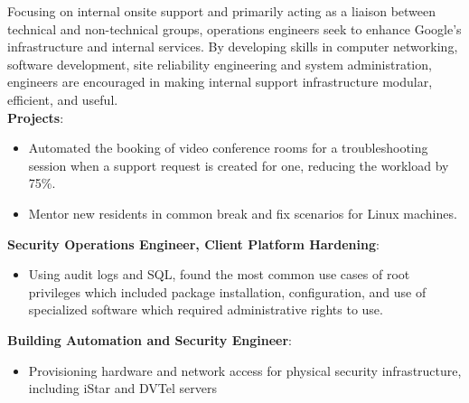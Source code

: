\documentclass[letter,sans]{moderncv}
\begin{document}
{Focusing on internal onsite support and primarily acting as a liaison between technical and non-technical groups, operations engineers seek to enhance Google's infrastructure and internal services. By developing skills in computer networking, software development, site reliability engineering and system administration, engineers are encouraged in making internal support infrastructure modular, efficient, and useful.\\
  \textbf{Projects}:
  \begin{itemize}
    \item Automated the booking of video conference rooms for a troubleshooting session when a support request is created for one, reducing the workload by 75\%.
    \item Mentor new residents in common break and fix scenarios for Linux machines.
  \end{itemize}
  \textbf{Security Operations Engineer, Client Platform Hardening}:
  \begin{itemize}
    \item Using audit logs and SQL, found the most common use cases of root privileges which included package installation, configuration, and use of specialized software which required administrative rights to use.
  \end{itemize}
  \textbf{Building Automation and Security Engineer}:
  \begin{itemize}
    \item Provisioning hardware and network access for physical security infrastructure, including iStar and DVTel servers
  \end{itemize}
}
\end{document}
